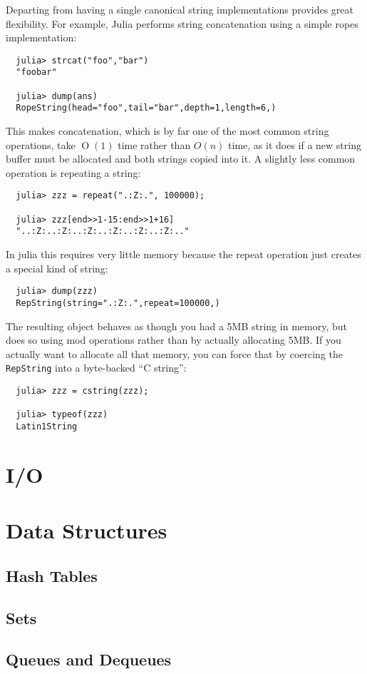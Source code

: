 \documentclass{article}
\renewcommand{\O}{\ensuremath{\operatorname{O}}}
\begin{document}
Departing from having a single canonical string implementations provides great flexibility.
For example, Julia performs string concatenation using a simple ropes implementation:
\begin{verbatim}
  julia> strcat("foo","bar")
  "foobar"

  julia> dump(ans)
  RopeString(head="foo",tail="bar",depth=1,length=6,)
\end{verbatim}
This makes concatenation, which is by far one of the most common string operations, take $\O(1)$ time rather than $O(n)$ time, as it does if a new string buffer must be allocated and both strings copied into it.
A slightly less common operation is repeating a string:
\begin{verbatim}
  julia> zzz = repeat(".:Z:.", 100000);

  julia> zzz[end>>1-15:end>>1+16]
  "..:Z:..:Z:..:Z:..:Z:..:Z:..:Z:.."
\end{verbatim}
In julia this requires very little memory because the repeat operation just creates a special kind of string:
\begin{verbatim}
  julia> dump(zzz)
  RepString(string=".:Z:.",repeat=100000,)
\end{verbatim}
The resulting object behaves as though you had a 5MB string in memory, but does so using mod operations rather than by actually allocating 5MB.
If you actually want to allocate all that memory, you can force that by coercing the \verb|RepString| into a byte-backed ``C string'':
\begin{verbatim}
  julia> zzz = cstring(zzz);

  julia> typeof(zzz)
  Latin1String
\end{verbatim}

\section{I/O}
\section{Data Structures}
\subsection{Hash Tables}
\subsection{Sets}
\subsection{Queues and Dequeues}
\end{document}
